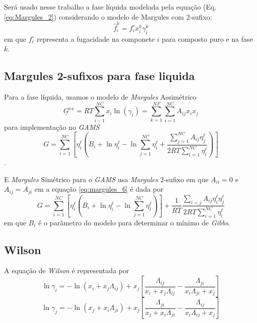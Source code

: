 Será usado nesse trabalho a fase líquida modelada pela equação (Eq. \ref{eq:Margules_2}) considerando o modelo de Margules com 2-sufixo:
\begin{equation}\label{eq:Fugacidade_2}
\hat{f}_i^{k}=f_{i}^{\circ}x_i^{k}\gamma_i^{k}
\end{equation}
em que $f_{i}^{\circ}$ representa a fugacidade na componete $i$ para composto puro e na fase $k$.

\subsection{Margules 2-sufixos para fase liquida}

Para a fase líquida, usamos o modelo de \textit{Margules} Assimétrico
\begin{equation}
\underline{G}^{ex}=RT\sum_{i-1}^{NC}x_i\ln(\gamma_{i})=\sum_{k=1}^{NF}\sum_{i=1}^{NC}A_{ij}x_ix_j
\end{equation}
para implementação no \textit{GAMS}
\begin{equation}\label{eq:margules_6}
G=\sum_{i=1}^{NC}\left[\eta_{i}^{\ell}\left(B_i+\ln\eta_i^\ell -\ln\sum_{j=1}^{NC}\eta_{i}^\ell+\dfrac{\displaystyle\sum_{j=1}^{NC}A_{ij} \eta_{j}^\ell}{2RT\displaystyle\sum_{i=1}^{NC}\eta_{i}^\ell}\right)\right]
\end{equation}
\cite{Rocha2009a}.

E \textit{Margules} Simétrico para o \textit{GAMS} usa \textit{Margules} 2-sufixo em que $A_{ii}=0$ e $A_{ij}=A_{ji}$ em a equação \ref{eq:margules_6} é dada por
\begin{equation}
G=\sum_{i=1}^{NC}\left[\eta_{i}^{\ell}\left(B_i+\ln\eta_i^\ell -\ln\sum_{j=1}^{NC}\eta_{i}^\ell\right)\right]+\dfrac{1}{RT}\dfrac{\displaystyle\sum_{i<j}A_{ij} \eta_{i}^\ell  \eta_{j}^\ell }{2RT\displaystyle\sum_{i=1}^{NC}\eta_{i}^\ell}
\end{equation}
em que $B_{i}$ é o parâmetro do modelo para determinar o mínimo de \textit{Gibbs}.\cite{Rocha2009a}

\subsection{Wilson}
A equação de \textit{Wilson} é representada por
\begin{equation}
\ln\gamma_{i}=-\ln(x_i+x_j\Lambda_{ij})+x_j\left[ \dfrac{\Lambda_{ij}}{x_i+x_j\Lambda_{ij}}-\dfrac{\Lambda_{ji}}{x_i\Lambda_{ji}+x_j}\right]
\end{equation}
\begin{equation}
\ln\gamma_{j}=-\ln(x_j+x_i\Lambda_{ji})+x_j\left[ \dfrac{\Lambda_{ji}}{x_j+x_i\Lambda_{ji}}-\dfrac{\Lambda_{ij}}{x_i\Lambda_{ij}+x_j}\right]
\end{equation}

